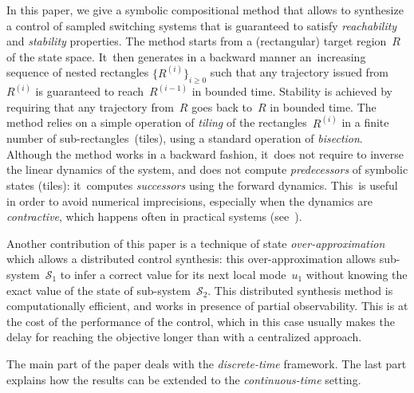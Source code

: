 In this paper, we give a symbolic compositional method that allows to
synthesize a control of sampled switching systems that is
guaranteed to satisfy \emph{reachability} and \emph{stability}
properties.
The method starts from a (rectangular) target region~$R$ of the state space.
It~then generates in a backward manner an~increasing sequence of
nested rectangles $\{R^{(i)}\}_{i\geq 0}$ such that any trajectory
issued from~$R^{(i)}$ is guaranteed to reach~$R^{(i-1)}$ in bounded
time.  Stability is achieved by requiring that any trajectory from~$R$
goes back to~$R$ in bounded time.
The method relies on a
simple operation of \emph{tiling} of the rectangles~$R^{(i)}$ in a
finite number of sub-rectangles~(tiles), using a standard operation of
\emph{bisection}.  Although the method works in a backward fashion,
it~does not require to inverse the linear dynamics of the system, 
and does not compute \emph{predecessors} of
symbolic states (tiles): it~computes \emph{successors} using the forward
dynamics.  This~is useful in order to avoid numerical imprecisions,
especially when the dynamics are \emph{contractive}, which happens
often in practical systems (see~\cite{Mitchell07}).

Another contribution of this paper is a technique
of state \emph{over-approximation} which allows 
a distributed control synthesis:
this over-approximation allows sub-system~$\mathcal S_1$ to infer a correct value for
its next local mode~$u_1$ without knowing the exact value of the state
of sub-system~$\mathcal S_2$.
This distributed synthesis method is computationally efficient,
and works in presence of partial observability.
This is at the cost of the performance of the control,
which in this case usually makes the delay for reaching the objective longer
than with a centralized approach.

The main part of the paper deals with the \emph{discrete-time}
framework.  The last part explains how the results can be extended to the
\emph{continuous-time} setting.

